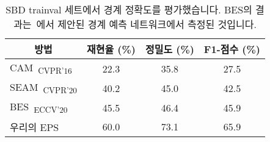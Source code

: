 \begin{table}[]
\centering
{\small
\begin{tabular}{@{}lccc@{}}
\toprule
\multicolumn{1}{c}{방법}                      & 재현율 (\%) & 정밀도 (\%) & F1-점수 (\%) \\ \midrule
\multicolumn{1}{l}{CAM~\cite{zhou2016learning}\textsubscript{CVPR'16}} & 22.3        & 35.8           & 27.5           \\
\multicolumn{1}{l}{SEAM~\cite{wang2020self}\textsubscript{CVPR'20}}    & 40.2        & 45.0           & 42.5           \\
\multicolumn{1}{l}{BES~\cite{chen2020boundary}\textsubscript{ECCV'20}} & 45.5        & 46.4           & 45.9           \\
\multicolumn{1}{l}{우리의 EPS}                        & 60.0        & 73.1          & 65.9           \\ \bottomrule
\end{tabular}
}
\vspace{2mm}
\caption{SBD trainval 세트에서 경계 정확도를 평가했습니다. BES의 결과는~\cite{chen2020boundary}에서 제안된 경계 예측 네트워크에서 측정된 것입니다.} \vspace{-2mm}
\label{tab:boundary}
\end{table}
